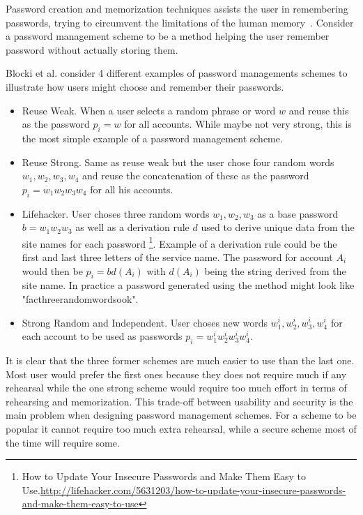 Password creation and memorization techniques assists the user in remembering passwords, trying to circumvent the limitations of the human memory~\cite{human-memory}. Consider a password management scheme to be a method helping the user remember password without actually storing them.
\par Blocki et al. \cite{naturally-rehearsing} consider 4 different examples of password managements schemes to illustrate how users might choose and remember their passwords.
\begin{itemize}
    \item{ Reuse Weak. } When a user selects a random phrase or word $w$ and reuse this as the password $p_i=w$ for all accounts. While maybe not very strong, this is the most simple example of a password management scheme.
    \item{ Reuse Strong. } Same as reuse weak but the user chose four random words $w_1,w_2,w_3,w_4$ and reuse the concatenation of these as the password $p_i = w_1w_2w_3w_4$ for all his accounts.
    \item{Lifehacker.} User choses three random words $w_1, w_2, w_3$ as a base password $b=w_1w_2w_3$ as well as a derivation rule $d$ used to derive unique data from the site names for each password \footnote{How to Update Your Insecure Passwords and Make Them Easy to Use.\url{http://lifehacker.com/5631203/how-to-update-your-insecure-passwords-and-make-them-easy-to-use}}. Example of a derivation rule could be the first and last three letters of the service name. The password for account $A_i$ would then be $p_i = b d(A_i)$ with $d(A_i)$ being the string derived from the site name. In practice a password generated using the method might look like "facthreerandomwordsook". 
    \item{Strong Random and Independent.} User choses new words $w^i_1, w^i_2, w^i_3, w^i_4$ for each account to be used as passwords $p_i = w^i_1w^i_2w^i_3w^i_4$.
\end{itemize}
It is clear that the three former schemes are much easier to use than the last one. Most user would prefer the first ones because they does not require much if any rehearsal while the one strong scheme would require too much effort in terms of rehearsing and memorization. This trade-off between usability and security is the main problem when designing password management schemes. For a scheme to be popular it cannot require too much extra rehearsal, while a secure scheme most of the time will require some.




